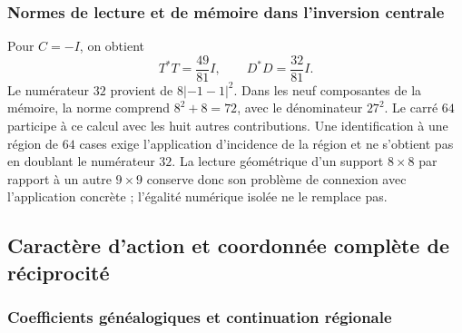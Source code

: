 \subsubsection{Normes de lecture et de mémoire dans l’inversion centrale}
\label{md:restop:treinta-y-dos}

Pour $C=-I$, on obtient
\begin{equation}
 T^*T=\frac{49}{81}I,\qquad
 D^*D=\frac{32}{81}I.
 \label{md:restop:normas}
\end{equation}
Le numérateur $32$ provient de $8|{-1}-1|^2$.
Dans les neuf composantes de la mémoire, la norme comprend
$8^2+8=72$, avec le dénominateur $27^2$. Le carré $64$ participe à
ce calcul avec les huit autres contributions.
Une identification à une région de $64$ cases exige l’application
d’incidence de la région et ne s’obtient pas en doublant le numérateur $32$.
La lecture géométrique d’un support $8\times8$ par rapport à un autre
$9\times9$ conserve donc son problème de connexion avec
l’application concrète ; l’égalité numérique isolée ne le remplace pas.

\clearpage
\subsection{Caractère d’action et coordonnée complète de réciprocité}
\label{md:restop:h5}

\subsubsection{Coefficients généalogiques et continuation régionale}
\label{md:restop:coeficientes}

